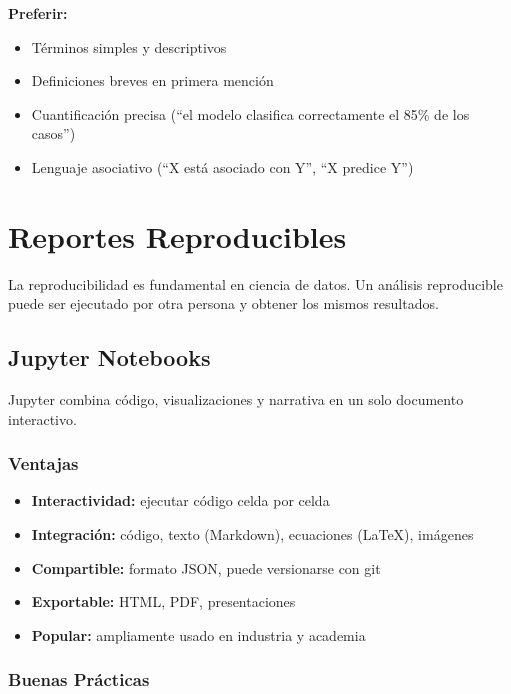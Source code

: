 \documentclass[11pt,a4paper]{article}
\begin{document}
\textbf{Preferir:}
\begin{itemize}
\item Términos simples y descriptivos
\item Definiciones breves en primera mención
\item Cuantificación precisa (``el modelo clasifica correctamente el 85\% de los casos'')
\item Lenguaje asociativo (``X está asociado con Y'', ``X predice Y'')
\end{itemize}

\section{Reportes Reproducibles}

La reproducibilidad es fundamental en ciencia de datos. Un análisis reproducible puede ser ejecutado por otra persona y obtener los mismos resultados.

\subsection{Jupyter Notebooks}

Jupyter combina código, visualizaciones y narrativa en un solo documento interactivo.

\subsubsection{Ventajas}

\begin{itemize}
\item \textbf{Interactividad:} ejecutar código celda por celda
\item \textbf{Integración:} código, texto (Markdown), ecuaciones (LaTeX), imágenes
\item \textbf{Compartible:} formato JSON, puede versionarse con git
\item \textbf{Exportable:} HTML, PDF, presentaciones
\item \textbf{Popular:} ampliamente usado en industria y academia
\end{itemize}

\subsubsection{Buenas Prácticas}
\end{document}

